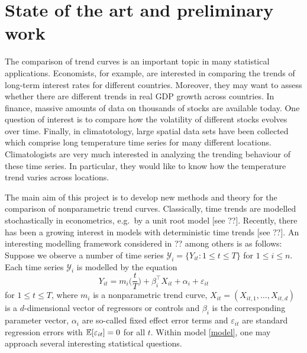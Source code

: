 \documentclass[a4paper,12pt]{article}
\begin{document}
\vspace{30pt}

\setcounter{section}{0}


\section{State of the art and preliminary work}


The comparison of trend curves is an important topic in many statistical applications. Economists, for example, are interested in comparing the trends of long-term interest rates for different countries. Moreover, they may want to assess whether there are different trends in real GDP growth across countries. In finance, massive amounts of data on thousands of stocks are available today. One question of interest is to compare how the volatility of different stocks evolves over time. Finally, in climatotology, large spatial data sets have been collected which comprise long temperature time series for many different locations. Climatologists are very much interested in analyzing the trending behaviour of these time series. In particular, they would like to know how the temperature trend varies across locations. 


The main aim of this project is to develop new methods and theory for the comparison of nonparametric trend curves. Classically, time trends are modelled stochastically in econometrics, e.g.\ by a unit root model [see ??]. Recently, there has been a growing interest in models with deterministic time trends [see ??]. An interesting modelling framework considered in ?? among others is as follows: Suppose we observe a number of time series $\mathcal{Y}_i = \{ Y_{it}: 1 \le t \le T \}$ for $1 \le i \le n$. Each time series $\mathcal{Y}_i$ is modelled by the equation
\begin{equation}\label{model}
Y_{it} = m_i \Big( \frac{t}{T} \Big) + \beta_i^\top X_{it} + \alpha_i + \varepsilon_{it}
\end{equation}
for $1 \le t \le T$, where $m_i$ is a nonparametric trend curve, $X_{it} = (X_{it,1},\ldots,X_{it,d})$ is a $d$-dimensional vector of regressors or controls and $\beta_i$ is the corresponding parameter vector, $\alpha_i$ are so-called fixed effect error terms and $\varepsilon_{it}$ are standard regression errors with $\mathbb{E}[\varepsilon_{it}] = 0$ for all $t$.  Within model \eqref{model}, one may approach several interesting statistical questions.
\vspace{15pt}
\end{document}
